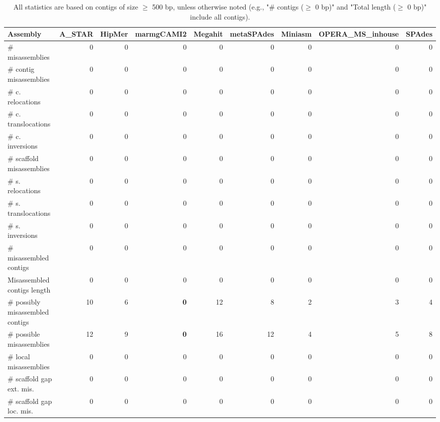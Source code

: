 \documentclass[12pt,a4paper]{article}
\begin{document}
\begin{table}[ht]
\begin{center}
\caption{All statistics are based on contigs of size $\geq$ 500 bp, unless otherwise noted (e.g., "\# contigs ($\geq$ 0 bp)" and "Total length ($\geq$ 0 bp)" include all contigs).}
\begin{tabular}{|l*{8}{|r}|}
\hline
Assembly & A\_STAR & HipMer & marmgCAMI2 & Megahit & metaSPAdes & Miniasm & OPERA\_MS\_inhouse & SPAdes \\ \hline
\# misassemblies & 0 & 0 & 0 & 0 & 0 & 0 & 0 & 0 \\ \hline
\hspace{2mm}\# contig misassemblies & 0 & 0 & 0 & 0 & 0 & 0 & 0 & 0 \\ \hline
\hspace{5mm}\# c. relocations & 0 & 0 & 0 & 0 & 0 & 0 & 0 & 0 \\ \hline
\hspace{5mm}\# c. translocations & 0 & 0 & 0 & 0 & 0 & 0 & 0 & 0 \\ \hline
\hspace{5mm}\# c. inversions & 0 & 0 & 0 & 0 & 0 & 0 & 0 & 0 \\ \hline
\hspace{2mm}\# scaffold misassemblies & 0 & 0 & 0 & 0 & 0 & 0 & 0 & 0 \\ \hline
\hspace{5mm}\# s. relocations & 0 & 0 & 0 & 0 & 0 & 0 & 0 & 0 \\ \hline
\hspace{5mm}\# s. translocations & 0 & 0 & 0 & 0 & 0 & 0 & 0 & 0 \\ \hline
\hspace{5mm}\# s. inversions & 0 & 0 & 0 & 0 & 0 & 0 & 0 & 0 \\ \hline
\# misassembled contigs & 0 & 0 & 0 & 0 & 0 & 0 & 0 & 0 \\ \hline
Misassembled contigs length & 0 & 0 & 0 & 0 & 0 & 0 & 0 & 0 \\ \hline
\# possibly misassembled contigs & 10 & 6 & {\bf 0} & 12 & 8 & 2 & 3 & 4 \\ \hline
\hspace{5mm}\# possible misassemblies & 12 & 9 & {\bf 0} & 16 & 12 & 4 & 5 & 8 \\ \hline
\# local misassemblies & 0 & 0 & 0 & 0 & 0 & 0 & 0 & 0 \\ \hline
\# scaffold gap ext. mis. & 0 & 0 & 0 & 0 & 0 & 0 & 0 & 0 \\ \hline
\# scaffold gap loc. mis. & 0 & 0 & 0 & 0 & 0 & 0 & 0 & 0 \\ \hline

\end{tabular}
\end{center}
\end{table}
\end{document}
